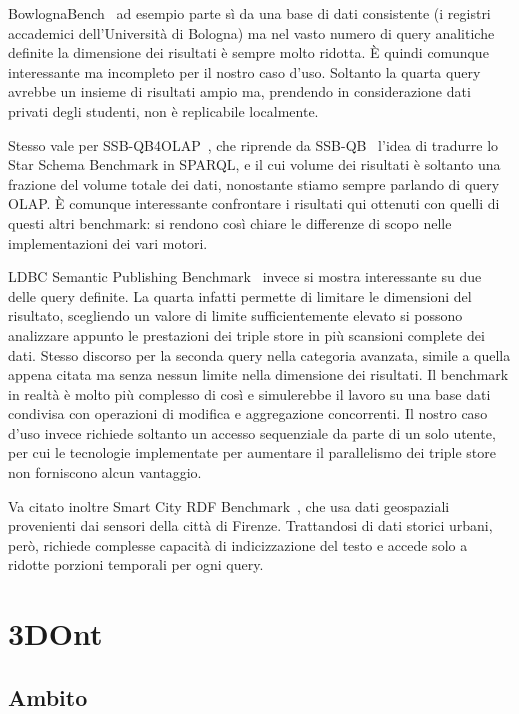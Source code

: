 \par BowlognaBench~\cite{demartini2012bowlogna} ad esempio parte sì da una base di dati consistente (i registri accademici dell'Università di Bologna) ma
nel vasto numero di query analitiche definite la dimensione dei risultati è sempre molto ridotta. È quindi comunque interessante
ma incompleto per il nostro caso d'uso. Soltanto la quarta query avrebbe un insieme di risultati ampio ma, prendendo in considerazione dati privati degli studenti,
non è replicabile localmente.
\par Stesso vale per SSB-QB4OLAP~\cite{etcheverry2017cubes}, che riprende da SSB-QB~\cite{kampgen2013ssbqb} l'idea di tradurre
lo Star Schema Benchmark in SPARQL, e il cui volume dei risultati è soltanto una frazione del volume totale dei dati, nonostante
stiamo sempre parlando di query OLAP. È comunque interessante confrontare i risultati qui ottenuti con quelli di questi 
altri benchmark: si rendono così chiare le differenze di scopo nelle implementazioni dei vari motori.
\par LDBC Semantic Publishing Benchmark~\cite{kotsev2016spb} invece si mostra interessante su due delle query definite. La quarta infatti permette
di limitare le dimensioni del risultato, scegliendo un valore di limite sufficientemente elevato si possono analizzare appunto
le prestazioni dei triple store in più scansioni complete dei dati. Stesso discorso per la seconda query nella categoria avanzata,
simile a quella appena citata ma senza nessun limite nella dimensione dei risultati.
Il benchmark in realtà è molto più complesso di così e simulerebbe il lavoro su una base dati condivisa con operazioni di
modifica e aggregazione concorrenti. Il nostro caso d'uso invece richiede soltanto un accesso sequenziale da parte di un solo utente,
per cui le tecnologie implementate per aumentare il parallelismo dei triple store non forniscono alcun vantaggio.
\par Va citato inoltre Smart City RDF Benchmark~\cite{bellini2018smartcity}, che usa dati geospaziali provenienti dai sensori
della città di Firenze. Trattandosi di dati storici urbani, però, richiede complesse capacità di indicizzazione del testo
e accede solo a ridotte porzioni temporali per ogni query.


\section{3DOnt}
\label{sec:3dont}

\subsection{Ambito}

